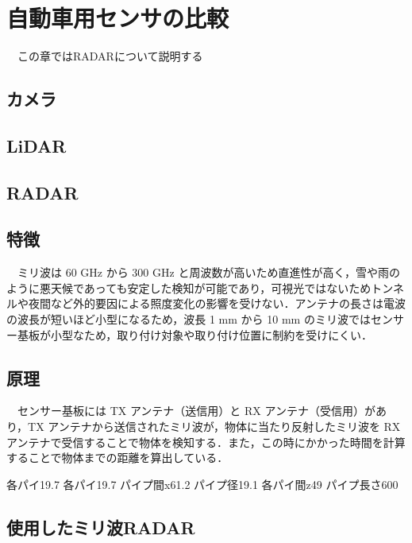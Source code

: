 \chapter{自動車用センサの比較}
　この章ではRADARについて説明する
\section{カメラ}
\section{LiDAR}
\section{RADAR}
\section{特徴}
　ミリ波は 60 GHz から 300 GHz と周波数が高いため直進性が高く，雪や雨のように悪天候であっても安定した検知が可能であり，可視光ではないためトンネルや夜間など外的要因による照度変化の影響を受けない．アンテナの長さは電波の波長が短いほど小型になるため，波長 1 mm から 10 mm のミリ波ではセンサー基板が小型なため，取り付け対象や取り付け位置に制約を受けにくい．

\section{原理}
　センサー基板には TX アンテナ（送信用）と RX アンテナ（受信用）があり，TX アンテナから送信されたミリ波が，物体に当たり反射したミリ波を RX アンテナで受信することで物体を検知する．また，この時にかかった時間を計算することで物体までの距離を算出している．

各パイ19.7
各パイ19.7
パイプ間x61.2
パイプ径19.1
各パイ間z49
パイプ長さ600

\section{}

\section{使用したミリ波RADAR}


